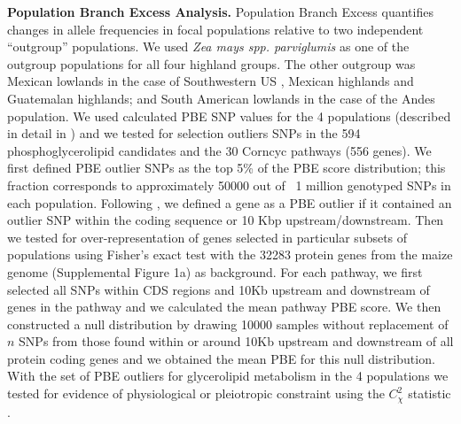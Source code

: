 \documentclass[9pt,twocolumn,twoside,lineno]{BioRxiv}
\begin{document}
\textbf{Population Branch Excess Analysis.}
Population Branch Excess quantifies changes in allele frequencies in focal populations relative to two independent “outgroup” populations.
We used \textit{Zea mays spp. parviglumis} as one of the outgroup populations for all four highland groups.  
The other outgroup was  Mexican lowlands  in the case of Southwestern US , Mexican highlands and Guatemalan highlands; and South American lowlands in the case of the Andes population. 
We used calculated PBE SNP values for the 4 populations (described in detail in \cite{Wang2020-mp}) and we tested for selection outliers SNPs in the 594 phosphoglycerolipid candidates and the 30 Corncyc pathways (556 genes).
We first defined PBE outlier SNPs as the top 5\% of the PBE score distribution; this fraction corresponds to approximately 50000 out of ~1 million genotyped SNPs in each population. 
Following \cite{Wang2020-mp}, we defined a gene as a PBE outlier if it contained an outlier SNP within the coding sequence or 10 Kbp upstream/downstream. 
Then we tested for over-representation of genes selected in particular subsets of populations using Fisher's exact test with the 32283 protein genes from the maize genome (Supplemental Figure 1a) \cite{wang2015a} as background. 
For each pathway, we first selected all SNPs within CDS regions and 10Kb upstream and downstream of genes in the pathway and we calculated the mean pathway PBE score. 
We then constructed a null distribution by drawing 10000 samples without replacement of $n$ SNPs from those found within or around 10Kb upstream and downstream of all protein coding genes and we obtained the mean PBE for this null distribution. 
With the set of PBE outliers for glycerolipid metabolism in the 4 populations we tested for evidence of physiological or pleiotropic constraint using the $C_\chi^2$ statistic \cite{yeaman2018}. 
\end{document}
